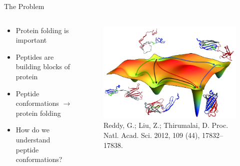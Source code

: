 \documentclass[10pt]{beamer}
\begin{document}
{%
\begin{frame}[fragile]{The Problem}
    \begin{columns}{}
        \begin{column}{0.45\textwidth}
            \begin{itemize}[<+->]
                \item{Protein folding is important}
                \item{Peptides are building blocks of protein}
                \item{Peptide conformations $\rightarrow$ protein folding}
                \item{How do we understand peptide conformations?}
            \end{itemize}
           \end{column}
           \begin{column}{0.6\textwidth}
               \begin{figure}
			       \includegraphics[width=1.0\linewidth]{images/ProteinFolding.png}
			       \caption*{Reddy, G.; Liu, Z.; Thirumalai, D. Proc. Natl. Acad. Sci. 2012, 109 (44), 17832–17838.}
			   \end{figure}
           \end{column}
       \end{columns}     
\end{frame}
}
\end{document}
